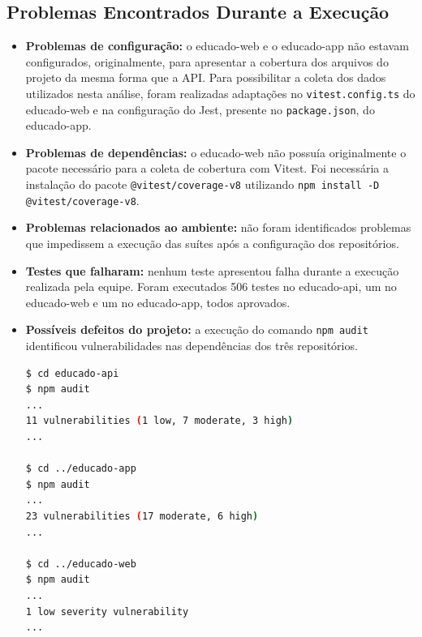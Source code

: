 \subsection{Problemas Encontrados Durante a Execução}
\begin{itemize}
\item \textbf{Problemas de configuração:}
o educado-web e o educado-app não estavam configurados, originalmente, para apresentar a cobertura dos arquivos do projeto da mesma forma que a API.
Para possibilitar a coleta dos dados utilizados nesta análise, foram realizadas adaptações no \texttt{vitest.config.ts} do educado-web e na configuração do Jest, presente no \texttt{package.json}, do educado-app.

\item \textbf{Problemas de dependências:}
o educado-web não possuía originalmente o pacote necessário para a coleta de cobertura com Vitest.
Foi necessária a instalação do pacote \texttt{@vitest/coverage-v8} utilizando \texttt{npm install -D @vitest/coverage-v8}.

\item \textbf{Problemas relacionados ao ambiente:}
não foram identificados problemas que impedissem a execução das suítes após a configuração dos repositórios.

\item \textbf{Testes que falharam:}
nenhum teste apresentou falha durante a execução realizada pela equipe.
Foram executados 506 testes no educado-api, um no educado-web e um no educado-app, todos aprovados.

\item \textbf{Possíveis defeitos do projeto:}
a execução do comando \texttt{npm audit} identificou vulnerabilidades nas dependências dos três repositórios.

\begin{lstlisting}[language=bash]
$ cd educado-api
$ npm audit
...
11 vulnerabilities (1 low, 7 moderate, 3 high)
...

$ cd ../educado-app
$ npm audit
... 
23 vulnerabilities (17 moderate, 6 high)
... 

$ cd ../educado-web
$ npm audit
... 
1 low severity vulnerability
...
\end{lstlisting}

\end{itemize}
